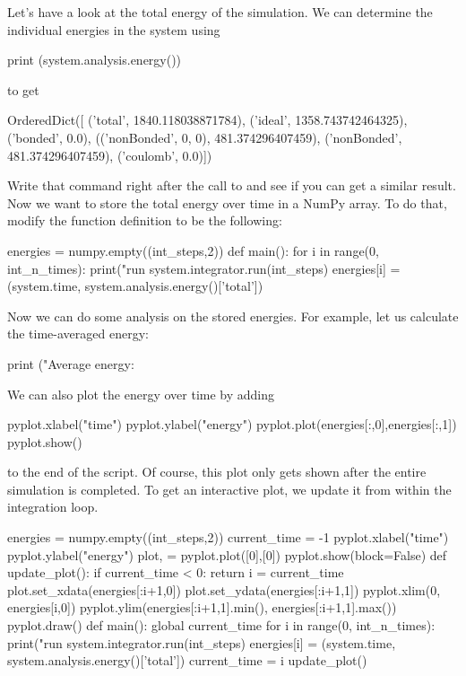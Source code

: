 \documentclass[
paper=a4,                       %
fontsize=11pt,                  %
twoside,                        %
footsepline,                    %
headsepline,                    %
headinclude=false,              %
footinclude=false,              %
pagesize,                       %
]{scrartcl}
\begin{document}
Let's have a look at the total energy of the simulation.
We can determine the individual energies in the system using
\begin{pypresso}
print (system.analysis.energy())
\end{pypresso}
to get
\begin{pypresso}
OrderedDict([
        ('total', 1840.118038871784),
        ('ideal', 1358.743742464325),
        ('bonded', 0.0), 
        (('nonBonded', 0, 0), 481.374296407459), 
        ('nonBonded', 481.374296407459), 
        ('coulomb', 0.0)])
\end{pypresso}
Write that command right after the call to  and see if you can get a similar result.
Now we want to store the total energy over time in a NumPy array.
To do that, modify the  function definition to be the following:
\begin{pypresso}
energies = numpy.empty((int_steps,2))
def main():
    for i in range(0, int_n_times):
        print("run %
        system.integrator.run(int_steps)
        energies[i] = (system.time, system.analysis.energy()['total'])
\end{pypresso}
Now we can do some analysis on the stored energies.
For example, let us calculate the time-averaged energy:
\begin{pypresso}
print ("Average energy: %
\end{pypresso}
We can also plot the energy over time by adding
\begin{pypresso}
pyplot.xlabel("time")
pyplot.ylabel("energy")
pyplot.plot(energies[:,0],energies[:,1])
pyplot.show()
\end{pypresso}
to the end of the script. Of course, this plot only gets shown after the entire simulation is completed.
To get an interactive plot, we update it from within the integration loop.
\begin{pypresso}
energies = numpy.empty((int_steps,2))
current_time = -1
pyplot.xlabel("time")
pyplot.ylabel("energy")
plot, = pyplot.plot([0],[0])
pyplot.show(block=False)
def update_plot():
    if current_time < 0:
        return
    i = current_time
    plot.set_xdata(energies[:i+1,0])
    plot.set_ydata(energies[:i+1,1])
    pyplot.xlim(0, energies[i,0])
    pyplot.ylim(energies[:i+1,1].min(), energies[:i+1,1].max())
    pyplot.draw()
def main():
    global current_time
    for i in range(0, int_n_times):
        print("run %
        system.integrator.run(int_steps)
        energies[i] = (system.time, system.analysis.energy()['total'])
        current_time = i
        update_plot()
\end{pypresso}
\end{document}
